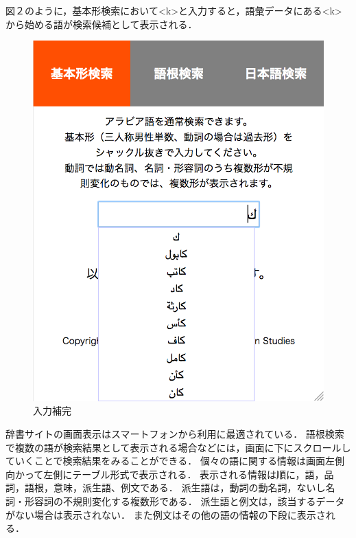 \documentclass[technicalreport]{ieicej}
\begin{document}
図２のように，基本形検索において<k>と入力すると，語彙データにある<k>から始める語が検索候補として表示される．

\begin{figure}[H]
\begin{center}
\includegraphics[scale=0.4]{fig02.png}
\caption{入力補完}
\end{center}
\end{figure}

辞書サイトの画面表示はスマートフォンから利用に最適されている．
語根検索で複数の語が検索結果として表示される場合などには，画面に下にスクロールしていくことで検索結果をみることができる．
個々の語に関する情報は画面左側向かって左側にテーブル形式で表示される．
表示される情報は順に，語，品詞，語根，意味，派生語、例文である．
派生語は，動詞の動名詞，ないし名詞・形容詞の不規則変化する複数形である．
派生語と例文は，該当するデータがない場合は表示されない．
また例文はその他の語の情報の下段に表示される．
\end{document}

